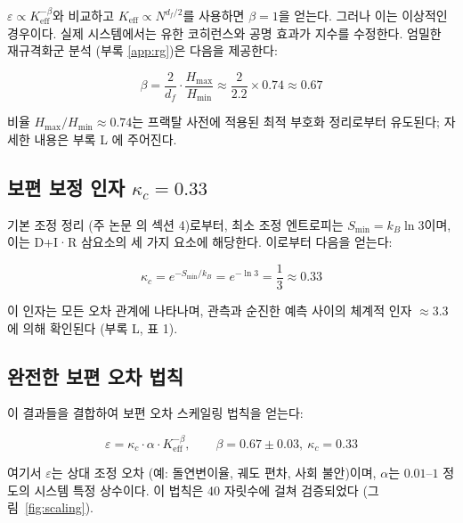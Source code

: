 \documentclass[12pt,a4paper]{article}
\newcommand{\Keff}{K_{\mathrm{eff}}}
\newcommand{\kappac}{\kappa_c}
\newcommand{\eps}{\varepsilon}
\newcommand{\df}{d_{\!f}}
\theoremstyle{remark}
\begin{document}
	\(\eps \propto \Keff^{-\beta}\)와 비교하고 \(\Keff \propto N^{\df/2}\)를 사용하면 \(\beta = 1\)을 얻는다. 그러나 이는 이상적인 경우이다. 실제 시스템에서는 유한 코히런스와 공명 효과가 지수를 수정한다. 엄밀한 재규격화군 분석 (부록 \ref{app:rg})은 다음을 제공한다:
	
	\begin{equation}
		\beta = \frac{2}{\df} \cdot \frac{H_{\max}}{H_{\min}} \approx \frac{2}{2.2} \times 0.74 \approx 0.67
		\label{eq:beta-derivation}
	\end{equation}
	
	비율 \(H_{\max}/H_{\min} \approx 0.74\)는 프랙탈 사전에 적용된 최적 부호화 정리로부터 유도된다; 자세한 내용은 부록 L \cite{AppendixL}에 주어진다.
	
	\subsection{보편 보정 인자 \(\kappac = 0.33\)}
	
	기본 조정 정리 (주 논문 \cite{Yakushev2026a}의 섹션 4)로부터, 최소 조정 엔트로피는 \(S_{\min} = k_B \ln 3\)이며, 이는 D+I·R 삼요소의 세 가지 요소에 해당한다. 이로부터 다음을 얻는다:
	
	\begin{equation}
		\kappac = e^{-S_{\min}/k_B} = e^{-\ln 3} = \frac{1}{3} \approx 0.33
		\label{eq:kappac-derivation}
	\end{equation}
	
	이 인자는 모든 오차 관계에 나타나며, 관측과 순진한 예측 사이의 체계적 인자 \(\approx 3.3\)에 의해 확인된다 (부록 L, 표 1).
	
	\subsection{완전한 보편 오차 법칙}
	
	이 결과들을 결합하여 보편 오차 스케일링 법칙을 얻는다:
	
	\begin{equation}
		\boxed{\eps = \kappac \cdot \alpha \cdot \Keff^{-\beta}, \qquad \beta = 0.67 \pm 0.03, \ \kappac = 0.33}
		\label{eq:universal-error}
	\end{equation}
	
	여기서 \(\eps\)는 상대 조정 오차 (예: 돌연변이율, 궤도 편차, 사회 불안)이며, \(\alpha\)는 \(0.01\)--\(1\) 정도의 시스템 특정 상수이다. 이 법칙은 40 자릿수에 걸쳐 검증되었다 (그림~\ref{fig:scaling}).
	
\end{document}
